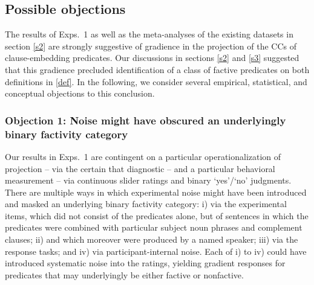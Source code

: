 \documentclass{language}
\newcommand{\6}{\mbox{$[\hspace*{-.6mm}[$}}
\newcommand{\9}{\mbox{$]\hspace*{-.6mm}]$}}
\begin{document}
\subsection{Possible objections}\label{s41}

The results of Exps.~1 as well as the meta-analyses of the existing datasets in section \ref{s2} are strongly suggestive of gradience in the projection of the CCs of clause-embedding predicates. Our discussions in sections \ref{s2} and \ref{s3} suggested that this gradience precluded identification of a class of factive predicates on both definitions in \ref{def}. In the following, we consider several empirical, statistical, and conceptual objections to this conclusion. 

\subsubsection{Objection 1: Noise might have obscured an underlyingly binary factivity category}\label{s-obj1}

Our results in Exps.~1 are contingent on a particular operationalization of projection -- via the certain that diagnostic -- and a particular behavioral measurement -- via continuous slider ratings and binary `yes'/`no' judgments. There are multiple ways in which experimental noise might have been introduced and masked an underlying binary factivity category:  i) via the experimental items, which did not consist of the predicates alone, but of sentences in which the predicates were combined with particular subject noun phrases and complement clauses; ii) and which moreover were produced by a named speaker; iii) via the response tasks; and iv) via participant-internal noise. Each of i) to iv) could have introduced systematic noise into the ratings, yielding gradient responses for predicates that may underlyingly be either factive or nonfactive.
\end{document}
